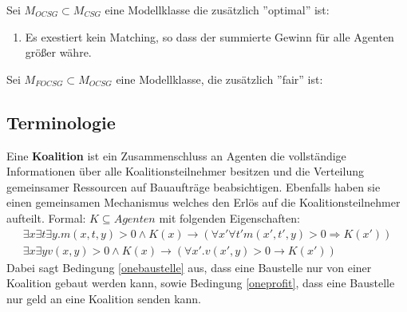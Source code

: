 %

Sei $M_{OCSG} \subset M_{CSG}$ eine Modellklasse die zusätzlich ''optimal'' ist:
\begin{enumerate}
  \item Es exestiert kein Matching, so dass der summierte Gewinn für alle Agenten größer währe.
\end{enumerate}

Sei $M_{FOCSG}\subset M_{OCSG}$ eine Modellklasse, die zusätzlich ''fair'' ist:


\subsection{Terminologie}
\label{sigmod}

\begin{definition}[Koalition]
  Eine \textbf{Koalition} ist ein Zusammenschluss an Agenten die vollständige Informationen über alle Koalitionsteilnehmer besitzen und die Verteilung gemeinsamer Ressourcen auf Bauaufträge beabsichtigen. Ebenfalls haben sie einen gemeinsamen Mechanismus welches den Erlös auf die Koalitionsteilnehmer aufteilt. Formal: $K\subseteq Agenten$ mit folgenden Eigenschaften:
  \begin{align}
    \exists x\exists t\exists y. m(x,t,y) > 0 \land K(x)\rightarrow (\forall x'\forall t' m(x',t',y) > 0\Rightarrow K(x')) \label{onebaustelle} \\
    \exists x\exists y v(x,y) > 0 \land K(x) \rightarrow (\forall x'.v(x', y) > 0 \rightarrow K(x')) \label{oneprofit}
  \end{align}
  Dabei sagt Bedingung \ref{onebaustelle} aus, dass eine Baustelle nur von einer Koalition gebaut werden kann, sowie Bedingung \ref{oneprofit}, dass eine Baustelle nur geld an eine Koalition senden kann.
\end{definition}

